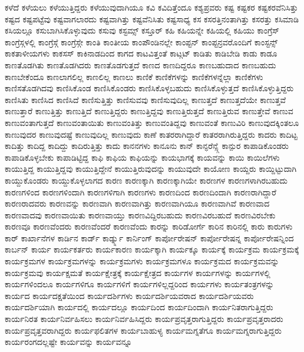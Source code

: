 {ಕಳೆದೆ
ಕಳೆಯಲು
ಕಳೆಯುತ್ತಿದ್ದರು
ಕಳೆಯುವುದಾಗಿಯೂ
ಕವಿ
ಕವಿದಿತ್ತೆಂದೂ
ಕಶ್ಯಪ್ರವರು
ಕಷ್ಟ
ಕಷ್ಟಕರ
ಕಷ್ಟಕರವೆನಿಸಿತ್ತು
ಕಷ್ಟದ
ಕಷ್ಟಪಟ್ಟೆವು
ಕಷ್ಟವಾಗಲಾರದು
ಕಷ್ಟವಾಗಿತ್ತು
ಕಷ್ಟವೆನಿಸಿತು
ಕಷ್ಟಸಾಧ್ಯ
ಕಸ
ಕಸರತ್ತಿನಂತಾಗಿತ್ತು
ಕಸರತ್ತು
ಕಸಿಮಾಡಿ
ಕಸಿಯಲ್ಲೂ
ಕಸುಬಾಗಿಸಿಕೊಳ್ಳುವುದು
ಕಸುವು
ಕಸ್ಟಮ್ಸ್
ಕಸ್ತೂರ್
ಕಹಿ
ಕಹಿಯನ್ನೇ
ಕಹಿಯಲ್ಲಿ
ಕಹಿಯು
ಕಾಂಗ್ರೆಸ್
ಕಾಂಗ್ರೆಸ್ಗಳಲ್ಲಿ
ಕಾಂಗ್ರೆಸ್ಗೆ
ಕಾಂಗ್ರೆಸ್ಗೇ
ಕಾಂತಿ
ಕಾಂತೀಯ
ಕಾಂಪೌಂಡಿನಲ್ಲೇ
ಕಾಂಪ್ಟನ್
ಕಾಂಪ್ಟನ್ರವರೊಂದಿಗೆ
ಕಾಂಸ್ಟನ್ಸ್
ಕಾಕತಾಳೀಯಗಳು
ಕಾಕಸಸ್
ಕಾಕಿನಾಡದಿಂದ
ಕಾಗದ
ಕಾಟವಿತ್ತಂತೆ
ಕಾಟ್ಗಟ್
ಕಾಡಿತು
ಕಾಡಿಬೇಡಿ
ಕಾಡು
ಕಾಡೂ
ಕಾಣತೊಡಗಿತು
ಕಾಣತೊಡಗಿದರು
ಕಾಣತೊಡಗುತ್ತದೆ
ಕಾಣದ
ಕಾಣದಿದ್ದರೂ
ಕಾಣಬಹುದಾದ
ಕಾಣಬಹುದು
ಕಾಣಬೇಕೆಂದೂ
ಕಾಣಲಾಗಲಿಲ್ಲ
ಕಾಣಲಿಲ್ಲ
ಕಾಣಲು
ಕಾಣಿಕೆ
ಕಾಣಿಕೆಗಳನ್ನು
ಕಾಣಿಕೆಗಳನ್ನೆಲ್ಲಾ
ಕಾಣಿಕೆಗಳು
ಕಾಣಿಸತೊಡಗಿದವು
ಕಾಣಿಸಿಕೊಂಡ
ಕಾಣಿಸಿಕೊಂಡರು
ಕಾಣಿಸಿಕೊಳ್ಳಬಹುದು
ಕಾಣಿಸಿಕೊಳ್ಳುತ್ತದೆ
ಕಾಣಿಸಿಕೊಳ್ಳುತ್ತಿದ್ದರು
ಕಾಣಿಸಿತು
ಕಾಣಿಸಿದ
ಕಾಣಿಸಿದೆ
ಕಾಣಿಸುತ್ತಿತ್ತು
ಕಾಣಿಸುವವು
ಕಾಣಿಸುವುದಿಲ್ಲ
ಕಾಣುತ್ತದೆ
ಕಾಣುತ್ತದೆಯೇ
ಕಾಣುತ್ತವೆ
ಕಾಣುತ್ತಾರೆ
ಕಾಣುತ್ತಿತ್ತು
ಕಾಣುತ್ತಿದೆ
ಕಾಣುತ್ತಿದ್ದರು
ಕಾಣುತ್ತಿದ್ದವು
ಕಾಣುತ್ತಿರುತ್ತದೆ
ಕಾಣುತ್ತಿರುವ
ಕಾಣುತ್ತೇವೆ
ಕಾಣುವ
ಕಾಣುವಂತಾಗುತ್ತದೆ
ಕಾಣುವಂತಾಯಿತು
ಕಾಣುವಂತಿತ್ತು
ಕಾಣುವಂತಿದ್ದವು
ಕಾಣುವಂತೆ
ಕಾಣುವಿರಿ
ಕಾಣುವುದಕ್ಕಿಂತಲೂ
ಕಾಣುವುದರ
ಕಾಣುವುದಷ್ಟೆ
ಕಾಣುವುದಿಲ್ಲ
ಕಾಣುವುದು
ಕಾಣೆ
ಕಾತರರಾಗಿದ್ದಾರೆ
ಕಾತರರಾಗಿರುತ್ತಿದ್ದರು
ಕಾದರು
ಕಾದಿಟ್ಟ
ಕಾದಿತ್ತು
ಕಾದಿದ್ದ
ಕಾದಿದ್ದು
ಕಾದಿರುತ್ತಿತ್ತು
ಕಾದು
ಕಾನನಗಳು
ಕಾನೂನು
ಕಾನ್
ಕಾನ್ಫರೆನ್ಸ್ಗೆ
ಕಾನ್ಪುರ
ಕಾಪಾಡಿಕೊಂಡರು
ಕಾಪಾಡಿಕೊಳ್ಳಬೇಕು
ಕಾಪಾಡಿಟ್ಟಿದ್ದ
ಕಾಫಿ
ಕಾಫಿಯ
ಕಾಫಿಯನ್ನು
ಕಾಯಭಾಗಕ್ಕೆ
ಕಾಯವನ್ನು
ಕಾಯಿ
ಕಾಯಿಲೆಗಳು
ಕಾಯುತ್ತಿದ್ದ
ಕಾಯುತ್ತಿದ್ದವು
ಕಾಯುತ್ತಿದ್ದೇನೆ
ಕಾಯುತ್ತಿರುವುದನ್ನು
ಕಾಯುವುದೇ
ಕಾಯೋಣ
ಕಾಯ್ದರು
ಕಾಯ್ದಿಟ್ಟುದಾಗಿ
ಕಾಯ್ದುಕೊಂಡರು
ಕಾಯ್ದುಕೊಳ್ಳಲಾಗದ
ಕಾರಣ
ಕಾರಣಕ್ಕಾಗಿ
ಕಾರಣಕ್ಕಾಗಿಯೇ
ಕಾರಣಗಳ
ಕಾರಣಗಳಾಗಿರಬಹುದು
ಕಾರಣಗಳಿಂದ
ಕಾರಣಗಳಿಂದಾಗಿ
ಕಾರಣಗಳಿಗಾಗಿ
ಕಾರಣಗಳು
ಕಾರಣದಿಂದ
ಕಾರಣದಿಂದಾಗಿ
ಕಾರಣರಾಗಿದ್ದಾರೆ
ಕಾರಣರಾದವರು
ಕಾರಣವನ್ನು
ಕಾರಣವಾಗಿ
ಕಾರಣವಾಗಿತ್ತು
ಕಾರಣವಾಗಿಯೂ
ಕಾರಣವಾಗಿವೆ
ಕಾರಣವಾದ
ಕಾರಣವಾದವು
ಕಾರಣವಾಯಿತು
ಕಾರಣವಾಯ್ತು
ಕಾರಣವಿದ್ದಿರಬಹುದು
ಕಾರಣವಿರಬಹುದೆ
ಕಾರಣವಿರಬೇಕು
ಕಾರಣವೂ
ಕಾರಣವೆಂದರು
ಕಾರಣವೆಂದರೆ
ಕಾರಣವೆಂದು
ಕಾರನ್ನು
ಕಾರಿಡೋರ್ಗೆ
ಕಾರಿನ
ಕಾರಿನಲ್ಲಿ
ಕಾರು
ಕಾರುಗಳು
ಕಾರ್
ಕಾರ್ಖಾನೆಗಳ
ಕಾರ್ಡಿನ
ಕಾರ್ಡ್
ಕಾರ್ಡ್ನ್ನು
ಕಾರ್ನಿಂಗ್
ಕಾರ್ಪೋರೇಷನ್
ಕಾರ್ಪೋರೇಷನ್ನ
ಕಾರ್ಪೋರೇಷನ್ನಿಂದ
ಕಾರ್ಬನ್
ಕಾರ್ಯ
ಕಾರ್ಯಕರ್ತರು
ಕಾರ್ಯಕಾರಣ
ಕಾರ್ಯಕ್ಕಾಗಿ
ಕಾರ್ಯಕ್ಕೂ
ಕಾರ್ಯಕ್ಕೆ
ಕಾರ್ಯಕ್ರಮ
ಕಾರ್ಯಕ್ರಮಕ್ಕೆ
ಕಾರ್ಯಕ್ರಮಗಳ
ಕಾರ್ಯಕ್ರಮಗಳನ್ನು
ಕಾರ್ಯಕ್ರಮಗಳು
ಕಾರ್ಯಕ್ರಮಗಳೂ
ಕಾರ್ಯಕ್ರಮದ
ಕಾರ್ಯಕ್ರಮವನ್ನು
ಕಾರ್ಯಕ್ರಮವು
ಕಾರ್ಯಕ್ಷಮತೆ
ಕಾರ್ಯಕ್ಷೇತ್ರಕ್ಕೆ
ಕಾರ್ಯಕ್ಷೇತ್ರದ
ಕಾರ್ಯಗಳ
ಕಾರ್ಯಗಳನ್ನು
ಕಾರ್ಯಗಳಲ್ಲಿ
ಕಾರ್ಯಗಳಿಂದಲೂ
ಕಾರ್ಯಗಳಿಗೂ
ಕಾರ್ಯಗಳಿಗೆ
ಕಾರ್ಯಗಳಿಲ್ಲದ್ದರಿಂದ
ಕಾರ್ಯಗಳು
ಕಾರ್ಯತಂತ್ರಗಳನ್ನು
ಕಾರ್ಯದ
ಕಾರ್ಯದಕ್ಷತೆಯಿಂದ
ಕಾರ್ಯದರ್ಶಿಗಳು
ಕಾರ್ಯದರ್ಶಿಯವರಾದ
ಕಾರ್ಯದರ್ಶಿಯವರು
ಕಾರ್ಯದರ್ಶಿಯಾಗಿ
ಕಾರ್ಯದಲ್ಲಿ
ಕಾರ್ಯದಲ್ಲೂ
ಕಾರ್ಯದಿಂದ
ಕಾರ್ಯದಿಂದಾಗಿ
ಕಾರ್ಯನಿತರಾಗುತ್ತಿದ್ದರು
ಕಾರ್ಯನಿರತ
ಕಾರ್ಯನಿರ್ವಹಿಸಲು
ಕಾರ್ಯನಿರ್ವಹಿಸಿದ್ದರು
ಕಾರ್ಯಪ್ರವೃತ್ತರಾಗುತ್ತಿದ್ದರು
ಕಾರ್ಯಪ್ರವೃತ್ತರಾದರು
ಕಾರ್ಯಪ್ರವೃತ್ತವರಾಗಿದ್ದರು
ಕಾರ್ಯಫಲಿತಗಳ
ಕಾರ್ಯಬಾಹುಳ್ಯ
ಕಾರ್ಯಮಗ್ನತೆಗೂ
ಕಾರ್ಯಮಗ್ನರಾಗುತ್ತಿದ್ದರು
ಕಾರ್ಯರಂಗದಲ್ಲಷ್ಟೇ
ಕಾರ್ಯವನ್ನು
ಕಾರ್ಯವನ್ನೂ
}
